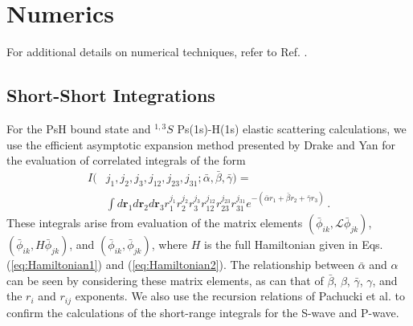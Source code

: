 \documentclass[preprint,showpacs,showkeys,preprintnumbers,amsmath,amssymb,longbibliography,pra,aps]{revtex4-1}
\begin{document}
\section{Numerics}
\label{sec:Numerical}

For additional details on numerical techniques, refer to Ref. \cite{WoodsDiss2015}.

\subsection{Short-Short Integrations}
\label{sec:ShortInt}
For the PsH bound state and $^{1,3}S$ Ps(1s)-H(1s) elastic scattering
calculations, we use
the efficient asymptotic expansion method presented by Drake and Yan
\cite{Drake1995} for the evaluation of correlated integrals of the form
\begin{align}
\label{eq:ShortInt}
I(&j_1,j_2,j_3,j_{12},j_{23},j_{31}; \bar{\alpha}, \bar{\beta}, \bar{\gamma}) =
  \nonumber \\
&\int
d \textbf{r}_1 d \textbf{r}_2 d \textbf{r}_3
r_1^{j_1} r_2^{j_2} r_3^{j_3} r_{12}^{j_{12}}
r_{23}^{j_{23}} r_{31}^{j_{31}}
e^{-(\bar{\alpha} r_1 + \bar{\beta} r_2 + \bar{\gamma} r_3)}\, .
\end{align}
These integrals arise from evaluation of the matrix elements
$(\bar{\phi}_{ik}, \mathcal{L} \bar{\phi}_{jk})$,
$(\bar{\phi}_{ik}, H \bar{\phi}_{jk})$,
and $(\bar{\phi}_{ik}, \bar{\phi}_{jk})$, where $H$
is the full Hamiltonian given in Eqs. (\ref{eq:Hamiltonian1}) and
(\ref{eq:Hamiltonian2}).
The relationship between $\bar{\alpha}$ and $\alpha$ can be seen by
considering these matrix elements, as can that of $\bar{\beta}$, $\beta$,
$\bar{\gamma}$, $\gamma$, and the $r_i$ and $r_{ij}$ exponents.
We also use the recursion relations of Pachucki
et al. \cite{Pachucki2004} to confirm the calculations of the short-range 
integrals for the S-wave and P-wave.
\end{document}
